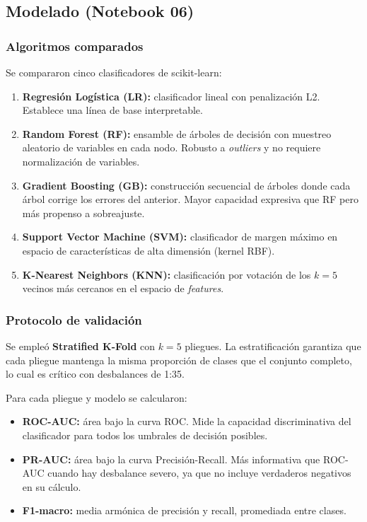 \documentclass[12pt,a4paper]{article}
\begin{document}
\subsection{Modelado (Notebook 06)}

\subsubsection{Algoritmos comparados}

Se compararon cinco clasificadores de scikit-learn:
\begin{enumerate}[nosep]
  \item \textbf{Regresión Logística (LR):} clasificador lineal con penalización L2.
        Establece una línea de base interpretable.
  \item \textbf{Random Forest (RF):} ensamble de árboles de decisión con muestreo
        aleatorio de variables en cada nodo.  Robusto a \textit{outliers} y no requiere
        normalización de variables.
  \item \textbf{Gradient Boosting (GB):} construcción secuencial de árboles donde cada
        árbol corrige los errores del anterior.  Mayor capacidad expresiva que RF pero
        más propenso a sobreajuste.
  \item \textbf{Support Vector Machine (SVM):} clasificador de margen máximo en espacio
        de características de alta dimensión (kernel RBF).
  \item \textbf{K-Nearest Neighbors (KNN):} clasificación por votación de los $k=5$ vecinos
        más cercanos en el espacio de \textit{features}.
\end{enumerate}

\subsubsection{Protocolo de validación}

Se empleó \textbf{Stratified K-Fold} con $k=5$ pliegues.
La estratificación garantiza que cada pliegue mantenga la misma proporción de clases que
el conjunto completo, lo cual es crítico con desbalances de 1:35.

Para cada pliegue y modelo se calcularon:
\begin{itemize}[nosep]
  \item \textbf{ROC-AUC:} área bajo la curva ROC.  Mide la capacidad discriminativa del
        clasificador para todos los umbrales de decisión posibles.
  \item \textbf{PR-AUC:} área bajo la curva Precisión-Recall.  Más informativa que ROC-AUC
        cuando hay desbalance severo, ya que no incluye verdaderos negativos en su cálculo.
  \item \textbf{F1-macro:} media armónica de precisión y recall, promediada entre clases.
\end{itemize}
\end{document}
